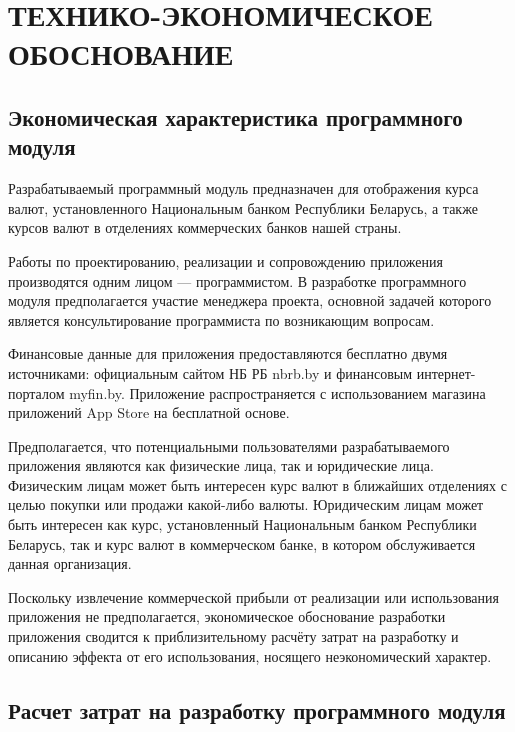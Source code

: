 \section[Технико-экономическое обоснование]{ТЕХНИКО-ЭКОНОМИЧЕСКОЕ ОБОСНОВАНИЕ}

\label{sec:teo}


\subsection{Экономическая характеристика программного модуля}

Разрабатываемый программный модуль предназначен для отображения курса валют,
установленного Национальным банком Республики Беларусь, а также курсов
валют в отделениях коммерческих банков нашей страны.

Работы по проектированию, реализации и сопровождению приложения
производятся одним лицом --- программистом.
В разработке программного модуля предполагается участие менеджера проекта,
основной задачей которого является консультирование программиста
по возникающим вопросам.

Финансовые данные для приложения предоставляются бесплатно двумя источниками:
официальным сайтом НБ РБ nbrb.by и финансовым интернет-порталом myfin.by.
Приложение распространяется с использованием магазина приложений App Store
на бесплатной основе.

Предполагается, что потенциальными пользователями разрабатываемого приложения
являются как физические лица, так и юридические лица. Физическим лицам может
быть интересен курс валют в ближайших отделениях с целью покупки или
продажи какой-либо валюты.
Юридическим лицам может быть интересен как курс, установленный Национальным
банком Республики Беларусь, так и курс валют в коммерческом банке,
в котором обслуживается данная организация.

Поскольку извлечение коммерческой прибыли от реализации или использования приложения
не предполагается, экономическое обоснование разработки приложения
сводится к приблизительному расчёту затрат на разработку и
описанию эффекта от его использования, носящего неэкономический характер.



\subsection{Расчет затрат на разработку программного модуля}

